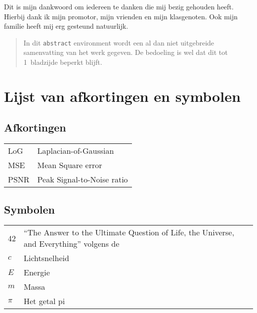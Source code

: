 \documentclass[master=ucll,dutch,twoside]{ucllfilip}
\begin{document}
\begin{preface}
  Dit is mijn dankwoord om iedereen te danken die mij bezig gehouden heeft. Hierbij dank ik mijn promotor, mijn vrienden en mijn klasgenoten.  Ook mijn familie heeft mij erg gesteund natuurlijk.


\end{preface}

\tableofcontents*

\begin{abstract}	
	
  In dit \texttt{abstract} environment wordt een al dan niet uitgebreide
  samenvatting van het werk gegeven. De bedoeling is wel dat dit tot
  1~bladzijde beperkt blijft.

  \lipsum[1]
  

\end{abstract}

\listoffiguresandtables
\chapter{Lijst van afkortingen en symbolen}
\section*{Afkortingen}
\begin{flushleft}
  \renewcommand{\arraystretch}{1.1}
  \begin{tabularx}{\textwidth}{@{}p{12mm}X@{}}
    LoG   & Laplacian-of-Gaussian \\
    MSE   & Mean Square error \\
    PSNR  & Peak Signal-to-Noise ratio \\
  \end{tabularx}
\end{flushleft}
\section*{Symbolen}
\begin{flushleft}
  \renewcommand{\arraystretch}{1.1}
  \begin{tabularx}{\textwidth}{@{}p{12mm}X@{}}
    42    & ``The Answer to the Ultimate Question of Life, the Universe,
            and Everything'' volgens de \cite{h2g2} \\
    $c$   & Lichtsnelheid \\
    $E$   & Energie \\
    $m$   & Massa \\
    $\pi$ & Het getal pi \\
  \end{tabularx}
\end{flushleft}
\end{document}
